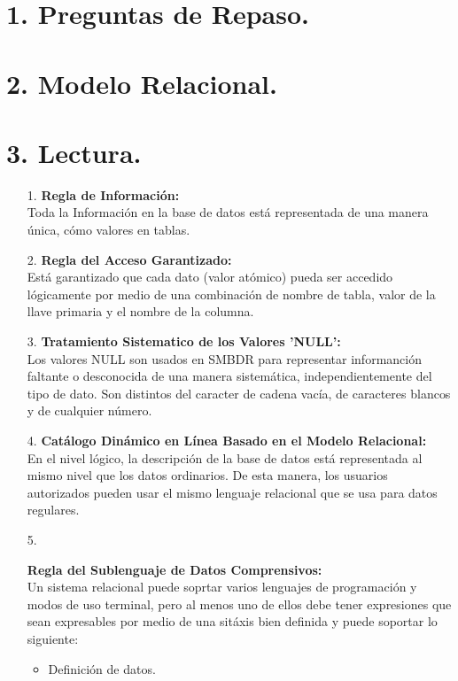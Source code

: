 \documentclass[a4paper, 12pt]{report}
\begin{document}
\section*{1. Preguntas de Repaso.}{
}

\section*{2. Modelo Relacional.}{
}

\section*{3. Lectura.}{
\begin{enumerate}
\item[1.]{\textbf{Regla de Información: } \\
    Toda la Información en la base de datos está representada de una manera única,
    cómo valores en tablas.
}
\item[2.]{\textbf{Regla del Acceso Garantizado: }\\
    Está garantizado que cada dato (valor atómico) pueda ser accedido lógicamente
    por medio de una combinación de nombre de tabla, valor de la llave primaria
    y el nombre de la columna.
}
\item[3.]{\textbf{Tratamiento Sistematico de los Valores 'NULL': }\\
    Los valores NULL son usados en SMBDR para representar informanción faltante
    o desconocida de una manera sistemática, independientemente del tipo de dato.
    Son distintos del caracter de cadena vacía, de caracteres blancos y de
    cualquier número.
}
\item[4.]{\textbf{Catálogo Dinámico en Línea Basado en el Modelo Relacional:}\\
    En el nivel lógico, la descripción de la base de datos está representada al
    mismo nivel que los datos ordinarios. De esta manera, los usuarios autorizados
    pueden usar el mismo lenguaje relacional que se usa para datos regulares.
}
\item[5.]{\textbf{Regla del Sublenguaje de Datos Comprensivos:}\\
    Un sistema relacional puede soprtar varios lenguajes de programación y modos
    de uso terminal, pero al menos uno de ellos debe tener expresiones que sean
    expresables por medio de una sitáxis bien definida y puede soportar lo
    siguiente:
    \begin{itemize}
        \item{Definición de datos.}

\end{itemize}}
\end{enumerate}}
\end{document}
